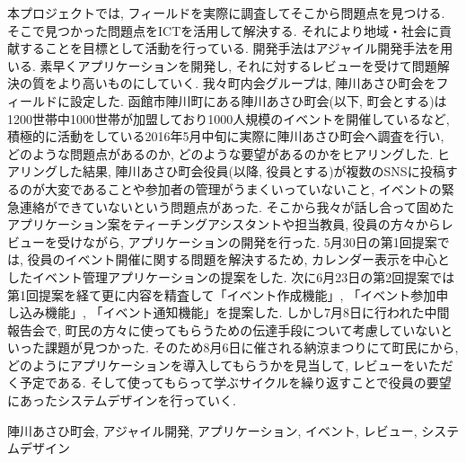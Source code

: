 \begin{jabstract}
\quad 本プロジェクトでは, フィールドを実際に調査してそこから問題点を見つける. そこで見つかった問題点をICTを活用して解決する. それにより地域・社会に貢献することを目標として活動を行っている. 開発手法はアジャイル開発手法を用いる. 素早くアプリケーションを開発し, それに対するレビューを受けて問題解決の質をより高いものにしていく.
我々町内会グループは, 陣川あさひ町会をフィールドに設定した. 函館市陣川町にある陣川あさひ町会(以下, 町会とする)は1200世帯中1000世帯が加盟しており1000人規模のイベントを開催しているなど, 積極的に活動をしている2016年5月中旬に実際に陣川あさひ町会へ調査を行い, どのような問題点があるのか, どのような要望があるのかをヒアリングした. ヒアリングした結果, 陣川あさひ町会役員(以降, 役員とする)が複数のSNSに投稿するのが大変であることや参加者の管理がうまくいっていないこと, イベントの緊急連絡ができていないという問題点があった. そこから我々が話し合って固めたアプリケーション案をティーチングアシスタントや担当教員, 役員の方々からレビューを受けながら, アプリケーションの開発を行った.
5月30日の第1回提案では, 役員のイベント開催に関する問題を解決するため, カレンダー表示を中心としたイベント管理アプリケーションの提案をした. 次に6月23日の第2回提案では第1回提案を経て更に内容を精査して「イベント作成機能」, 「イベント参加申し込み機能」, 「イベント通知機能」を提案した. しかし7月8日に行われた中間報告会で,
町民の方々に使ってもらうための伝達手段について考慮していないといった課題が見つかった. そのため8月6日に催される納涼まつりにて町民にから, どのようにアプリケーションを導入してもらうかを見当して, レビューをいただく予定である. そして使ってもらって学ぶサイクルを繰り返すことで役員の要望にあったシステムデザインを行っていく.

\begin{jkeyword}
陣川あさひ町会, アジャイル開発, アプリケーション, イベント, レビュー, システムデザイン
\end{jkeyword}
\end{jabstract}
​
